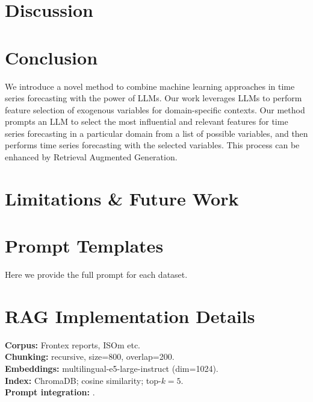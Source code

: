\documentclass[conference]{IEEEtran}
\begin{document}
\section{Discussion}

\section{Conclusion}

We introduce a novel method to combine machine learning approaches in time series forecasting with the power of LLMs. Our work leverages LLMs to perform feature selection of exogenous variables for domain-specific contexts. Our method prompts an LLM to select the most influential and relevant features for time series forecasting in a particular domain from a list of possible variables, and then performs time series forecasting with the selected variables. This process can be enhanced by Retrieval Augmented Generation. 

\section{Limitations \& Future Work}


\bigskip
\setcounter{secnumdepth}{1}
\appendix

\section{Prompt Templates}\label{app:prompts}
Here we provide the full prompt for each dataset.
\section{RAG Implementation Details}\label{app:rag}
\textbf{Corpus:} Frontex reports, ISOm etc. \\
\textbf{Chunking:} recursive, size=800, overlap=200. \\
\textbf{Embeddings:} multilingual-e5-large-instruct (dim=1024). \\
\textbf{Index:} ChromaDB; cosine similarity; top-$k=5$. \\
\textbf{Prompt integration:} .


\end{document}
